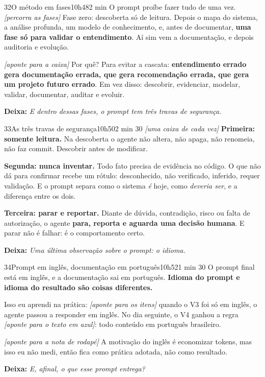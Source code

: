 \documentclass[11pt,a4paper]{article}
\newcommand{\acao}[1]{{\color{ouroMB!75!black}\small\itshape [#1]}}
\newcommand{\deixa}[1]{\par{\color{verdeMB}\small\bfseries \faLongArrowAltRight\; Deixa:} {\small\itshape #1}}
\begin{document}
\begin{slide}{32}{O método em fases}{10h48}{2 min}
O prompt proíbe fazer tudo de uma vez. \acao{percorra as fases} Fase zero: descoberta só de leitura. Depois o mapa do sistema, a análise profunda, um modelo de conhecimento, e, antes de documentar, \textbf{uma fase só para validar o entendimento}. Aí sim vem a documentação, e depois auditoria e evolução.

\acao{aponte para a caixa} Por quê? Para evitar a cascata: \textbf{entendimento errado gera documentação errada, que gera recomendação errada, que gera um projeto futuro errado}. Em vez disso: descobrir, evidenciar, modelar, validar, documentar, auditar e evoluir.
\deixa{E dentro dessas fases, o prompt tem três travas de segurança.}
\end{slide}

\begin{slide}{33}{As três travas de segurança}{10h50}{2 min 30}
\acao{uma caixa de cada vez}
\textbf{Primeira: somente leitura.} Na descoberta o agente não altera, não apaga, não renomeia, não faz commit. Descobrir antes de modificar.

\textbf{Segunda: nunca inventar.} Todo fato precisa de evidência no código. O que não dá para confirmar recebe um rótulo: desconhecido, não verificado, inferido, requer validação. E o prompt separa como o sistema \emph{é} hoje, como \emph{deveria ser}, e a diferença entre os dois.

\textbf{Terceira: parar e reportar.} Diante de dúvida, contradição, risco ou falta de autorização, o agente \textbf{para, reporta e aguarda uma decisão humana}. E parar não é falhar: é o comportamento certo.
\deixa{Uma última observação sobre o prompt: o idioma.}
\end{slide}

\begin{slide}{34}{Prompt em inglês, documentação em português}{10h52}{1 min 30}
O prompt final está em inglês, e a documentação sai em português. \textbf{Idioma do prompt e idioma do resultado são coisas diferentes.}

Isso eu aprendi na prática: \acao{aponte para os itens} quando o V3 foi só em inglês, o agente passou a responder em inglês. No dia seguinte, o V4 ganhou a regra \acao{aponte para o texto em azul}: todo conteúdo em português brasileiro.

\acao{aponte para a nota de rodapé} A motivação do inglês é economizar tokens, mas isso eu não medi, então fica como prática adotada, não como resultado.
\deixa{E, afinal, o que esse prompt entrega?}
\end{slide}
\end{document}
